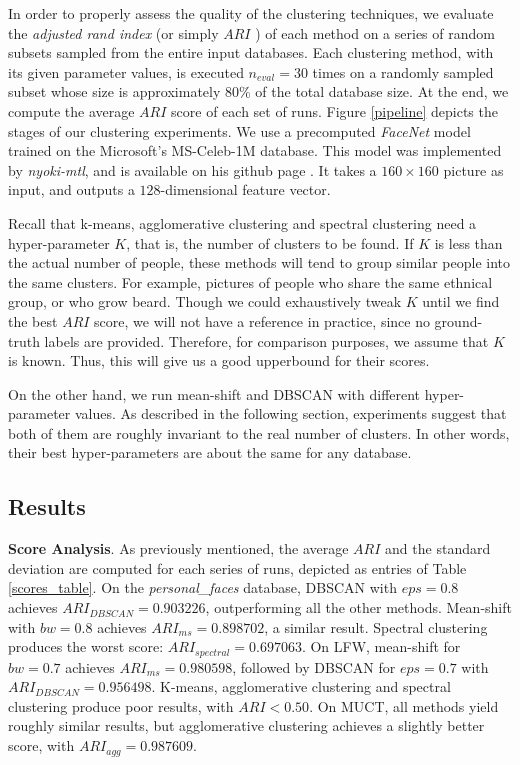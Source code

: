 \documentclass[conference]{IEEEtran}
\begin{document}
In order to properly assess the quality of the clustering techniques, we evaluate the \textit{adjusted rand index} (or simply $ARI$ \cite{b9}) of each method on a series of random subsets sampled from the entire input databases.
Each clustering method, with its given parameter values, is executed $n_{eval} = 30$ times on a randomly sampled subset whose size is approximately $80\%$ of the total database size.
At the end, we compute the average $ARI$ score of each set of runs.
Figure \ref{pipeline} depicts the stages of our clustering experiments.
We use a precomputed \textit{FaceNet} model trained on the Microsoft's MS-Celeb-1M database.
This model was implemented by \textit{nyoki-mtl}, and is available on his github page \cite{b10}.
It takes a $160 \times 160$ picture as input, and outputs a $128$-dimensional feature vector.

Recall that k-means, agglomerative clustering and spectral clustering need a hyper-parameter $K$, that is, the number of clusters to be found.
If $K$ is less than the actual number of people, these methods will tend to group similar people into the same clusters.
For example, pictures of people who share the same ethnical group, or who grow beard.
Though we could exhaustively tweak $K$ until we find the best $ARI$ score, we will not have a reference in practice, since no ground-truth labels are provided.
Therefore, for comparison purposes, we assume that $K$ is known.
Thus, this will give us a good upperbound for their scores.

On the other hand, we run mean-shift and DBSCAN with different hyper-parameter values.
As described in the following section, experiments suggest that both of them are roughly invariant to the real number of clusters.
In other words, their best hyper-parameters are about the same for any database.

\subsection{Results}

\textbf{Score Analysis}. As previously mentioned, the average $ARI$ and the standard deviation are computed for each series of runs, depicted as entries of Table \ref{scores_table}.
On the \textit{personal\_faces} database, DBSCAN with $eps = 0.8$ achieves $ARI_{DBSCAN} = 0.903226$, outperforming all the other methods.
Mean-shift with $bw = 0.8$ achieves $ARI_{ms} = 0.898702$, a similar result.
Spectral clustering produces the worst score: $ARI_{spectral} = 0.697063$.
On LFW, mean-shift for $bw = 0.7$ achieves $ARI_{ms} = 0.980598$, followed by DBSCAN for $eps = 0.7$ with $ARI_{DBSCAN} = 0.956498$.
K-means, agglomerative clustering and spectral clustering produce poor results, with $ARI < 0.50$.
On MUCT, all methods yield roughly similar results, but agglomerative clustering achieves a slightly better score, with $ARI_{agg} = 0.987609$.
\end{document}
